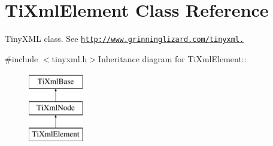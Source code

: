 \hypertarget{class_ti_xml_element}{
\section{TiXmlElement Class Reference}
\label{class_ti_xml_element}
}


TinyXML class. See \href{http://www.grinninglizard.com/tinyxml.}{\tt http://www.grinninglizard.com/tinyxml.}  


{\ttfamily \#include $<$tinyxml.h$>$}Inheritance diagram for TiXmlElement::\begin{figure}[H]
\begin{center}
\leavevmode
\includegraphics[height=3cm]{class_ti_xml_element}
\end{center}
\end{figure}
